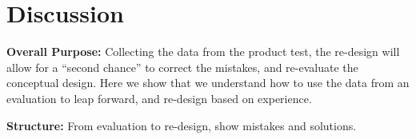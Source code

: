 \section{Discussion}
\textbf{Overall Purpose:} Collecting the data from the product test, the re-design will allow for a “second chance” to correct the mistakes, and re-evaluate the conceptual design. Here we show that we understand how to use the data from an evaluation to leap forward, and re-design based on experience.

\noindent\textbf{Structure:} From evaluation to re-design, show mistakes and solutions.